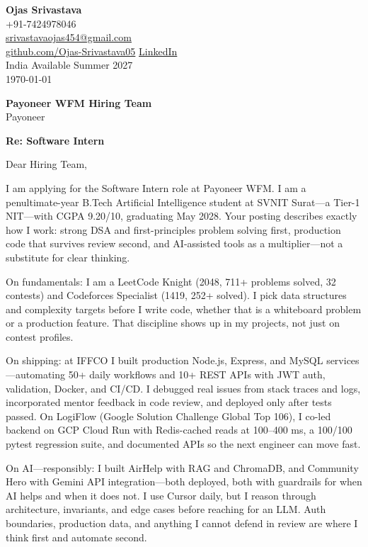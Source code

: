 \documentclass[a4paper,11pt]{article}
\begin{document}
\begin{flushright}
\textbf{Ojas Srivastava} \\
+91-7424978046 \\
\href{mailto:srivastavaojas454@gmail.com}{srivastavaojas454@gmail.com} \\
\href{https://github.com/Ojas-Srivastava05}{github.com/Ojas-Srivastava05} \textbar{}
\href{https://linkedin.com/in/ojas-srivastava05}{LinkedIn} \\
India \textbar{} Available Summer 2027 \\
\today
\end{flushright}

\vspace{4mm}
\textbf{Payoneer WFM Hiring Team} \\
Payoneer

\vspace{2mm}
\textbf{Re: Software Intern}

Dear Hiring Team,

I am applying for the Software Intern role at Payoneer WFM. I am a penultimate-year B.Tech Artificial Intelligence student at SVNIT Surat---a Tier-1 NIT---with CGPA 9.20/10, graduating May 2028. Your posting describes exactly how I work: strong DSA and first-principles problem solving first, production code that survives review second, and AI-assisted tools as a multiplier---not a substitute for clear thinking.

On fundamentals: I am a LeetCode Knight (2048, 711+ problems solved, 32 contests) and Codeforces Specialist (1419, 252+ solved). I pick data structures and complexity targets before I write code, whether that is a whiteboard problem or a production feature. That discipline shows up in my projects, not just on contest profiles.

On shipping: at IFFCO I built production Node.js, Express, and MySQL services---automating 50+ daily workflows and 10+ REST APIs with JWT auth, validation, Docker, and CI/CD. I debugged real issues from stack traces and logs, incorporated mentor feedback in code review, and deployed only after tests passed. On LogiFlow (Google Solution Challenge Global Top 106), I co-led backend on GCP Cloud Run with Redis-cached reads at 100--400 ms, a 100/100 pytest regression suite, and documented APIs so the next engineer can move fast.

On AI---responsibly: I built AirHelp with RAG and ChromaDB, and Community Hero with Gemini API integration---both deployed, both with guardrails for when AI helps and when it does not. I use Cursor daily, but I reason through architecture, invariants, and edge cases before reaching for an LLM. Auth boundaries, production data, and anything I cannot defend in review are where I think first and automate second.
\end{document}
